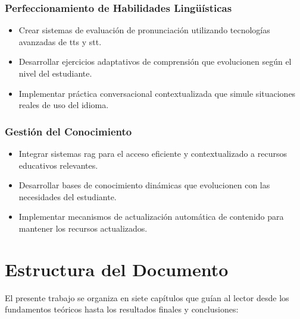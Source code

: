 \subsubsection{Perfeccionamiento de Habilidades Lingüísticas}
\label{subsubsec:perfeccionamiento-habilidades}

\begin{itemize}
  \item Crear sistemas de evaluación de pronunciación utilizando tecnologías avanzadas de \gls{tts} y \gls{stt}.
  \item Desarrollar ejercicios adaptativos de comprensión que evolucionen según el nivel del estudiante.
  \item Implementar práctica conversacional contextualizada que simule situaciones reales de uso del idioma.
\end{itemize}

\subsubsection{Gestión del Conocimiento}
\label{subsubsec:gestion-conocimiento}

\begin{itemize}
  \item Integrar sistemas \gls{rag} para el acceso eficiente y contextualizado a recursos educativos relevantes.
  \item Desarrollar bases de conocimiento dinámicas que evolucionen con las necesidades del estudiante.
  \item Implementar mecanismos de actualización automática de contenido para mantener los recursos actualizados.
\end{itemize}

\section{Estructura del Documento}
\label{sec:estructura-documento}

El presente trabajo se organiza en siete capítulos que guían al lector desde los fundamentos teóricos hasta los resultados finales y conclusiones:

